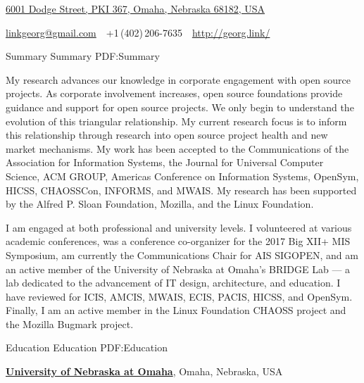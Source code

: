 \documentclass[letterpaper,MMMyyyy,nonstopmode]{simpleresumecv}
\newcommand{\CVAuthor}{Georg J.P. Link}
\newcommand{\CVWebpage}{http://georg.link/}
\begin{document}

\Title{\CVAuthor}

\begin{SubTitle}
\href{https://www.google.com/maps/place/University+of+Nebraska+at+Omaha}
{6001 Dodge Street, PKI 367, Omaha, Nebraska 68182, USA}
\par
\href{mailto:linkgeorg@gmail.com}
{linkgeorg@gmail.com}
\,\SubBulletSymbol\,
+1\,(402)\,206-7635
\,\SubBulletSymbol\,
\href{\CVWebpage}
{\url{\CVWebpage}}
\end{SubTitle}

\begin{Body}


\Section
{Summary}
{Summary}
{PDF:Summary}

My research advances our knowledge in corporate engagement with open
source projects. As corporate involvement increases, open source foundations
provide guidance and support for open source projects. We only begin to
understand the evolution of this triangular relationship. My current research focus 
is to inform this relationship through research into open source project health 
and new market mechanisms. 
My work has been accepted to 
the Communications of the Association for Information Systems,
the Journal for Universal Computer Science,
ACM GROUP, 
Americas Conference on Information Systems,
OpenSym,
HICSS, 
CHAOSSCon,
INFORMS,
and MWAIS.
My research has been supported by the Alfred P. Sloan Foundation, Mozilla, and the Linux Foundation.


\BigGap
I am engaged at both professional and university levels. I volunteered 
at various academic conferences, was a conference co-organizer for the 
2017 Big XII+ MIS Symposium, am currently the Communications Chair for AIS SIGOPEN, 
and am an active member of the University of Nebraska at Omaha's BRIDGE Lab ---
a lab dedicated to the advancement of IT design, architecture, and education. 
I have reviewed for ICIS, AMCIS, MWAIS, ECIS, PACIS, HICSS, and OpenSym.
Finally, I am an active member in the Linux Foundation CHAOSS project and 
the Mozilla Bugmark project.



\Section
{Education}
{Education}
{PDF:Education}

\Entry
\href{http://unomaha.edu/}
{\textbf{University of Nebraska at Omaha}},
Omaha, Nebraska, USA


\end{Body}
\end{document}

